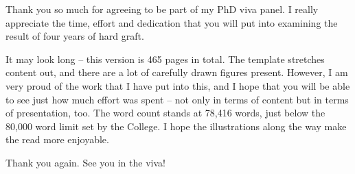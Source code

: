 
\begin{preamble}
{}

Thank you so much for agreeing to be part of my PhD viva panel. I really appreciate the time, effort and dedication that you will put into examining the result of four years of hard graft.

It may look long -- this version is 465 pages in total. The template stretches content out, and there are a lot of carefully drawn figures present. However, I am very proud of the work that I have put into this, and I hope that you will be able to see just how much effort was spent -- not only in terms of content but in terms of presentation, too. The word count stands at 78,416 words, just below the 80,000 word limit set by the College. I hope the illustrations along the way make the read more enjoyable.

Thank you again. See you in the viva!
\end{preamble}